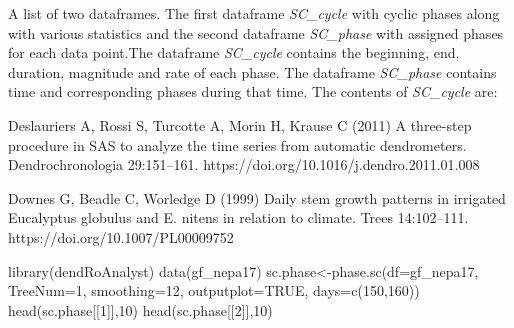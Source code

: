 \documentclass[a4paper]{book}
\begin{document}
%
\begin{Value}
A list of two dataframes. The first dataframe \emph{SC\_cycle} with cyclic phases along with various statistics and the second dataframe \emph{SC\_phase} with assigned phases for each data point.The dataframe \emph{SC\_cycle} contains the beginning, end, duration, magnitude and rate of each phase. The dataframe \emph{SC\_phase} contains time and corresponding phases during that time.
The contents of \emph{SC\_cycle} are:

\end{Value}
%
\begin{References}\relax
Deslauriers A, Rossi S, Turcotte A, Morin H, Krause C (2011) A three-step procedure in SAS to analyze the time series from automatic dendrometers. Dendrochronologia 29:151–161. https://doi.org/10.1016/j.dendro.2011.01.008

Downes G, Beadle C, Worledge D (1999) Daily stem growth patterns in irrigated Eucalyptus globulus and E. nitens in relation to climate. Trees 14:102–111. https://doi.org/10.1007/PL00009752
\end{References}
%
\begin{Examples}
\begin{ExampleCode}
library(dendRoAnalyst)
data(gf_nepa17)
sc.phase<-phase.sc(df=gf_nepa17, TreeNum=1, smoothing=12, outputplot=TRUE, days=c(150,160))
head(sc.phase[[1]],10)
head(sc.phase[[2]],10)

\end{ExampleCode}
\end{Examples}
\end{document}
